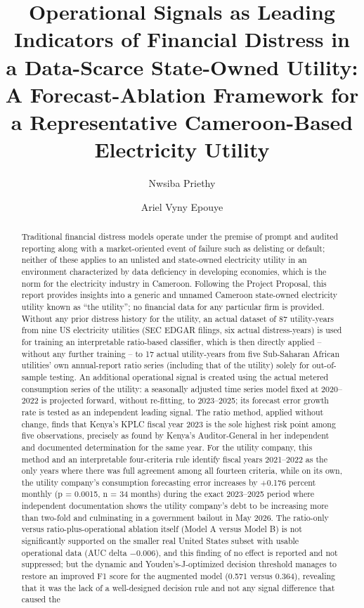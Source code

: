 \documentclass[final,1p,times]{elsarticle}
\begin{document}
\begin{frontmatter}

\title{Operational Signals as Leading Indicators of Financial Distress in a Data-Scarce State-Owned Utility: A Forecast-Ablation Framework for a Representative Cameroon-Based Electricity Utility}

\author{Nwsiba Priethy}
\author{Ariel Vyny Epouye}
\address{MScFE 690 Capstone Project, WorldQuant University}

\begin{abstract}
Traditional financial distress models operate under the premise of prompt and audited reporting along with a market-oriented event of failure such as delisting or default; neither of these applies to an unlisted and state-owned electricity utility in an environment characterized by data deficiency in developing economies, which is the norm for the electricity industry in Cameroon. Following the Project Proposal, this report provides insights into a generic and unnamed Cameroon state-owned electricity utility known as ``the utility''; no financial data for any particular firm is provided. Without any prior distress history for the utility, an actual dataset of 87 utility-years from nine US electricity utilities (SEC EDGAR filings, six actual distress-years) is used for training an interpretable ratio-based classifier, which is then directly applied – without any further training – to 17 actual utility-years from five Sub-Saharan African utilities' own annual-report ratio series (including that of the utility) solely for out-of-sample testing. An additional operational signal is created using the actual metered consumption series of the utility: a seasonally adjusted time series model fixed at 2020–2022 is projected forward, without re-fitting, to 2023–2025; its forecast error growth rate is tested as an independent leading signal. The ratio method, applied without change, finds that Kenya's KPLC fiscal year 2023 is the sole highest risk point among five observations, precisely as found by Kenya's Auditor-General in her independent and documented determination for the same year. For the utility company, this method and an interpretable four-criteria rule identify fiscal years 2021--2022 as the only years where there was full agreement among all fourteen criteria, while on its own, the utility company's consumption forecasting error increases by +0.176 percent monthly (p = 0.0015, n = 34 months) during the exact 2023--2025 period where independent documentation shows the utility company's debt to be increasing more than two-fold and culminating in a government bailout in May 2026. The ratio-only versus ratio-plus-operational ablation itself (Model A versus Model B) is not significantly supported on the smaller real United States subset with usable operational data (AUC delta $-0.006$), and this finding of no effect is reported and not suppressed; but the dynamic and Youden's-J-optimized decision threshold manages to restore an improved F1 score for the augmented model (0.571 versus 0.364), revealing that it was the lack of a well-designed decision rule and not any signal difference that caused the 
\end{abstract}
\end{frontmatter}
\end{document}

